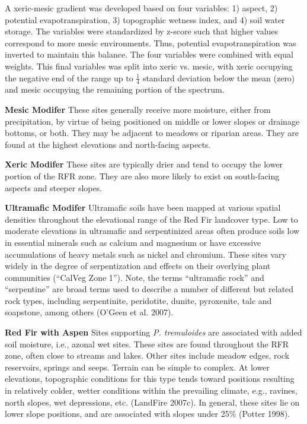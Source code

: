A xeric-mesic gradient was developed based on four variables: 1) aspect, 2) potential evapotranspiration, 3) topographic wetness index, and 4) soil water storage. The variables were standardized by z-score such that higher values correspond to more mesic environments. Thus, potential evapotranspiration was inverted to maintain this balance. The four variables were combined with equal weights. This final variables was split into xeric vs. mesic, with xeric occupying the negative end of the range up to $\frac{1}{4}$ standard deviation below the mean (zero) and mesic occupying the remaining portion of the spectrum.




\begin{adjustwidth}{2cm}{}
\textbf{Mesic Modifer } These sites generally receive more moisture, either from precipitation, by virtue of being positioned on middle or lower slopes or drainage bottoms, or both. They may be adjacent to meadows or riparian areas. They are found at the highest elevations and north-facing aspects.

\textbf{Xeric Modifer} These sites are typically drier and tend to occupy the lower portion of the RFR zone. They are also more likely to exist on south-facing aspects and steeper slopes.

\textbf{Ultramafic Modifer} Ultramafic soils have been mapped at various spatial densities throughout the elevational range of the Red Fir landcover type. Low to moderate elevations in ultramafic and serpentinized areas often produce soils low in essential minerals such as calcium and magnesium or have excessive accumulations of heavy metals such as nickel and chromium. These sites vary widely in the degree of serpentization and effects on their overlying plant communities (``CalVeg Zone 1''). Note, the terms ``ultramafic rock'' and ``serpentine'' are broad terms used to describe a number of different but related rock types, including serpentinite, peridotite, dunite, pyroxenite, talc and soapstone, among others (O’Geen et al. 2007).

\end{adjustwidth}

\textbf{Red Fir with Aspen} Sites supporting \emph{P. tremuloides} are associated with added soil moisture, i.e., azonal wet sites. These sites are found throughout the RFR zone, often close to streams and lakes. Other sites include meadow edges, rock reservoirs, springs and seeps. Terrain can be simple to complex. At lower elevations, topographic conditions for this type tends toward positions resulting in relatively colder, wetter conditions within the prevailing climate, e.g., ravines, north slopes, wet depressions, etc. (LandFire 2007c). In general, these sites lie on lower slope positions, and are associated with slopes under 25\% (Potter 1998).

